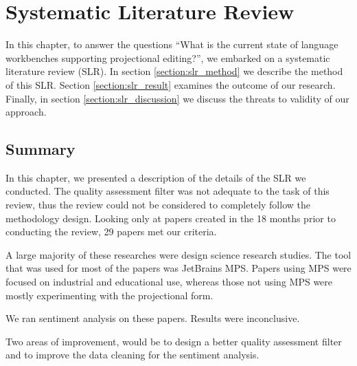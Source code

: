 \chapter{Systematic Literature Review}
\label{chapter:SLR}

In this chapter, to answer the questions ``What is the current state of language workbenches supporting projectional editing?'', we embarked on a systematic literature review (SLR).
In section \ref{section:slr_method} we describe the method of this SLR.
Section \ref{section:slr_result} examines the outcome of our research.
Finally, in section \ref{section:slr_discussion} we discuss the threats to validity of our approach. 








\section{Summary}
In this chapter, we presented a description of the details of the SLR we conducted.
The quality assessment filter was not adequate to the task of this review, thus the review could not be considered to completely follow the methodology design.
Looking only at papers created in the 18 months prior to conducting the review, 29 papers met our criteria.

A large majority of these researches were design science research studies.
The tool that was used for most of the papers was JetBrains MPS.
Papers using MPS were focused on industrial and educational use, whereas those not using MPS were mostly experimenting with the projectional form.

We ran sentiment analysis on these papers. 
Results were inconclusive.

Two areas of improvement, would be to design a better quality assessment filter and to improve the data cleaning for the sentiment analysis.